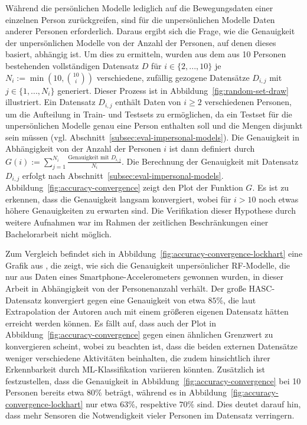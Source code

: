 Während die persönlichen Modelle lediglich auf die Bewegungsdaten einer einzelnen Person zurückgreifen, sind für die unpersönlichen Modelle Daten anderer Personen erforderlich. Daraus ergibt sich die Frage, wie die Genauigkeit der unpersönlichen Modelle von der Anzahl der Personen, auf denen dieses basiert, abhängig ist. Um dies zu ermitteln, wurden aus dem aus 10 Personen bestehenden vollständigen Datensatz $D$ für $i \in \{2, ..., 10\}$ je $N_i := \min(10, \binom{10}{i})$ verschiedene, zufällig gezogene Datensätze $D_{i,j}$ mit $j \in \{1, ..., N_i\}$ generiert. Dieser Prozess ist in Abbildung~\ref{fig:random-set-draw} illustriert. Ein Datensatz $D_{i,j}$ enthält Daten von $i \geq 2$ verschiedenen Personen, um die Aufteilung in Train- und Testsets zu ermöglichen, da ein Testset für die unpersönlichen Modelle genau eine Person enthalten soll und die Mengen disjunkt sein müssen (vgl. Abschnitt~\ref{subsec:eval-impersonal-models}). Die Genauigkeit in Abhängigkeit von der Anzahl der Personen $i$ ist dann definiert durch $G(i) := \sum_{j=1}^{N_i} \frac{\text{Genauigkeit mit } D_{i,j}}{N_i}$. Die Berechnung der Genauigkeit mit Datensatz $D_{i,j}$ erfolgt nach Abschnitt~\ref{subsec:eval-impersonal-models}.
Abbildung~\ref{fig:accuracy-convergence} zeigt den Plot der Funktion $G$. Es ist zu erkennen, dass die Genauigkeit langsam konvergiert, wobei für $i > 10$ noch etwas höhere Genauigkeiten zu erwarten sind. Die Verifikation dieser Hypothese durch weitere Aufnahmen war im Rahmen der zeitlichen Beschränkungen einer Bachelorarbeit nicht möglich.

Zum Vergleich befindet sich in Abbildung~\ref{fig:accuracy-convergence-lockhart} eine Grafik aus \cite{Lockhart2014}, die zeigt, wie sich die Genauigkeit unpersönlicher \ac{RF}-Modelle, die nur aus Daten eines Smartphone-Accelerometers gewonnen wurden, in dieser Arbeit in Abhängigkeit von der Personenanzahl verhält. Der große \acs{HASC}-Datensatz konvergiert gegen eine Genauigkeit von etwa $85 \%$, die laut Extrapolation der Autoren auch mit einem größeren eigenen Datensatz hätten erreicht werden können. Es fällt auf, dass auch der Plot in Abbildung~\ref{fig:accuracy-convergence} gegen einen ähnlichen Grenzwert zu konvergieren scheint, wobei zu beachten ist, dass die beiden externen Datensätze weniger verschiedene Aktivitäten beinhalten, die zudem hinsichtlich ihrer Erkennbarkeit durch \acs{ML}-Klassifikation variieren könnten. Zusätzlich ist festzustellen, dass die Genauigkeit in Abbildung~\ref{fig:accuracy-convergence} bei 10 Personen bereits etwa $80 \%$ beträgt, während es in Abbildung~\ref{fig:accuracy-convergence-lockhart} nur etwa $63 \%$, respektive $70 \%$ sind. Dies deutet darauf hin, dass mehr Sensoren die Notwendigkeit vieler Personen im Datensatz verringern.

